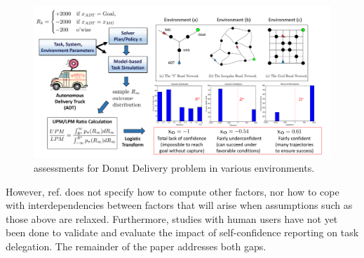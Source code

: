     \begin{figure}[tbp]
        \centering
        \includegraphics[width=0.7\linewidth]{Figures/xO_FullADT.png}
        \caption{\xO{} assessments for Donut Delivery problem in various environments. }
        \label{fig:xOexample}
    \end{figure}



However, ref. \cite{Aitken2016-cv} does not specify how to compute other factors, nor how to cope with interdependencies between factors that will arise when assumptions such as those above are relaxed. Furthermore, studies with human users have not yet been done to validate and evaluate the impact of self-confidence reporting on task delegation. The remainder of the paper addresses both gaps. 
